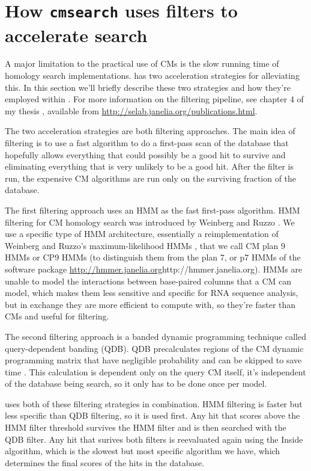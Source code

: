 \section{How \texttt{cmsearch} uses filters to accelerate search}

A major limitation to the practical use of CMs is the slow running
time of homology search implementations.  has two
acceleration strategies for alleviating this. In this section we'll
briefly describe these two strategies and how they're employed within
. For more information on the  filtering
pipeline, see chapter 4 of my thesis \cite{Nawrocki09b}, available
from \url{http://selab.janelia.org/publications.html}.

The two acceleration strategies are both filtering approaches.  The
main idea of filtering is to use a fast algorithm to do a first-pass
scan of the database that hopefully allows everything that
could possibly be a good hit to survive and eliminating everything
that is very unlikely to be a good hit. After the filter is run, the
expensive CM algorithms are run only on the surviving fraction of the
database.

The first filtering approach uses an HMM as the fast first-pass
algorithm. HMM filtering for CM homology search was introduced by
Weinberg and Ruzzo
\cite{WeinbergRuzzo04,WeinbergRuzzo04b,WeinbergRuzzo06}. We use a
specific type of HMM architecture, essentially a reimplementation of
Weinberg and Ruzzo's maximum-likelihood HMMs \cite{WeinbergRuzzo06},
that we call CM plan 9 HMMs or CP9 HMMs (to distinguish them from the
plan 7, or p7 HMMs of the  software package
\url{http://hmmer.janelia.org}{http://hmmer.janelia.org}). HMMs
are unable to model the interactions between base-paired columns that
a CM can model, which makes them less sensitive and specific for RNA
sequence analysis, but in exchange they are more efficient to compute
with, so they're faster than CMs and useful for filtering.

The second filtering approach is a banded dynamic programming
technique called query-dependent banding (QDB). QDB precalculates
regions of the CM dynamic programming matrix that have negligible
probability and can be skipped to save time
\cite{NawrockiEddy07}. This calculation is dependent only on the query
CM itself, it's independent of the database being search, so it only
has to be done once per model. 

 uses both of these filtering strategies in
combination. HMM filtering is faster but less specific than QDB
filtering, so it is used first. Any hit that scores above the HMM
filter threshold survives the HMM filter and is then searched with the
QDB filter. Any hit that surives both filters is reevaluated again
using the Inside algorithm, which is the slowest but most specific
algorithm we have, which determines the final scores of the hits in
the database.

